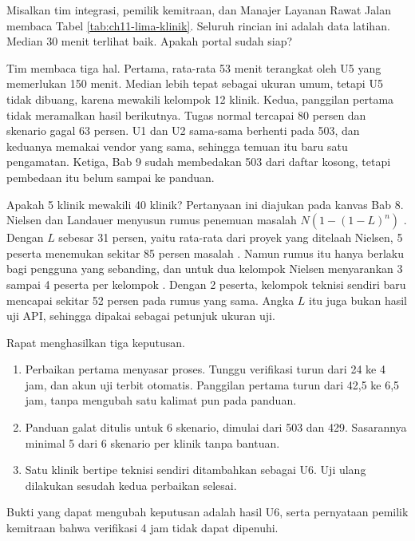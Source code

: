 \begin{kasus}[title={Kasus Medikara Health: Membaca Hasil Lima Klinik Uji}]
Misalkan tim integrasi, pemilik kemitraan, dan Manajer Layanan Rawat Jalan membaca Tabel \ref{tab:ch11-lima-klinik}. Seluruh
rincian ini adalah data latihan. Median 30 menit terlihat baik. Apakah portal sudah siap?

Tim membaca tiga hal. Pertama, rata-rata 53 menit terangkat oleh U5 yang memerlukan 150 menit. Median lebih tepat sebagai
ukuran umum, tetapi U5 tidak dibuang, karena mewakili kelompok 12 klinik. Kedua, panggilan pertama tidak meramalkan hasil
berikutnya. Tugas normal tercapai 80 persen dan skenario gagal 63 persen. U1 dan U2 sama-sama berhenti pada 503, dan
keduanya memakai vendor yang sama, sehingga temuan itu baru satu pengamatan. Ketiga, Bab 9 sudah membedakan 503 dari daftar
kosong, tetapi pembedaan itu belum sampai ke panduan.

Apakah 5 klinik mewakili 40 klinik? Pertanyaan ini diajukan pada kanvas Bab 8. Nielsen dan Landauer menyusun rumus
penemuan masalah $N(1-(1-L)^n)$ \cite{c11-nielsen1993}. Dengan $L$ sebesar 31 persen, yaitu rata-rata dari proyek yang
ditelaah Nielsen, 5 peserta menemukan sekitar 85 persen masalah \cite{c11-nielsen2000}. Namun rumus itu hanya berlaku bagi
pengguna yang sebanding, dan untuk dua kelompok Nielsen menyarankan 3 sampai 4 peserta per kelompok \cite{c11-nielsen2000}.
Dengan 2 peserta, kelompok teknisi sendiri baru mencapai sekitar 52 persen pada rumus yang sama. Angka $L$ itu juga bukan
hasil uji API, sehingga dipakai sebagai petunjuk ukuran uji.

Rapat menghasilkan tiga keputusan.
\begin{enumerate}
  \item Perbaikan pertama menyasar proses. Tunggu verifikasi turun dari 24 ke 4 jam, dan akun uji terbit otomatis.
        Panggilan pertama turun dari 42,5 ke 6,5 jam, tanpa mengubah satu kalimat pun pada panduan.
  \item Panduan galat ditulis untuk 6 skenario, dimulai dari 503 dan 429. Sasarannya minimal 5 dari 6 skenario per klinik
        tanpa bantuan.
  \item Satu klinik bertipe teknisi sendiri ditambahkan sebagai U6. Uji ulang dilakukan sesudah kedua perbaikan selesai.
\end{enumerate}

Bukti yang dapat mengubah keputusan adalah hasil U6, serta pernyataan pemilik kemitraan bahwa verifikasi 4 jam tidak dapat
dipenuhi.
\end{kasus}


